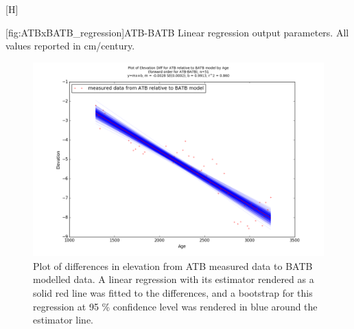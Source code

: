 \begin{center}[H]
	\begin{flushleft}
	[fig:ATBxBATB_regression]{ATB-BATB Linear regression output parameters. All values reported in cm/century.}
	\end{flushleft}
\end{center}


\newpage

\begin{figure}[H]
	\includegraphics[width=1.3\linewidth, angle=270 ]{data/bothNonZero/withinSeventyFivePercent/gias/theGIA_ATB_relative_to_BATB.png}
	\caption{Plot of differences in elevation from ATB measured data to BATB modelled data. A linear regression with its estimator rendered as
	 a solid red line was fitted to the differences, and a bootstrap for this regression at 95 \% confidence level was rendered in blue
	 around the estimator line.}
	\label{fig:gias_ATBxBATB}
\end{figure}


